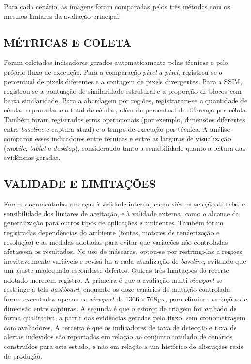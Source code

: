 \documentclass{UNESC}
\begin{document}
Para cada cenário, as imagens foram comparadas pelos três métodos com os mesmos limiares da avaliação principal.

\subsection{MÉTRICAS E COLETA}
Foram coletados indicadores gerados automaticamente pelas técnicas e pelo próprio fluxo de execução. Para a comparação \emph{pixel a pixel}, registrou-se o percentual de pixels diferentes e a contagem de pixels divergentes. Para a SSIM, registrou-se a pontuação de similaridade estrutural e a proporção de blocos com baixa similaridade. Para a abordagem por regiões, registraram-se a quantidade de células reprovadas e o total de células, além do percentual de diferença por célula. Também foram registrados erros operacionais (por exemplo, dimensões diferentes entre \emph{baseline} e captura atual) e o tempo de execução por técnica. A análise comparou esses indicadores entre técnicas e entre as larguras de visualização (\textit{mobile}, \textit{tablet} e \textit{desktop}), considerando tanto a sensibilidade quanto a leitura das evidências geradas.

\subsection{VALIDADE E LIMITAÇÕES}
Foram documentadas ameaças à validade interna, como viés na seleção de telas e sensibilidade dos limiares de aceitação, e à validade externa, como o alcance da generalização para outros tipos de aplicações e ambientes. Também foram registradas dependências do ambiente (fontes, motores de renderização e resolução) e as medidas adotadas para evitar que variações não controladas afetassem os resultados. No uso de máscaras, optou-se por restringi-las a regiões inevitavelmente variáveis e revisá-las a cada atualização de \emph{baseline}, evitando que um ajuste inadequado escondesse defeitos. Outras três limitações do recorte adotado merecem registro. A primeira é que a avaliação multi-\emph{viewport} se restringe à tela \textit{dashboard}, enquanto os doze cenários de mutação controlada foram executados apenas no \emph{viewport} de 1366\,$\times$\,768\,px, para eliminar variações de dimensão entre capturas. A segunda é que o esforço de triagem foi avaliado de forma qualitativa, a partir das evidências geradas pelo fluxo, sem cronometragem com avaliadores. A terceira é que os indicadores de taxa de detecção e taxa de alertas indevidos são reportados em relação ao conjunto rotulado de cenários construídos para este estudo, e não em relação a um histórico de alterações reais de produção.
\end{document}
